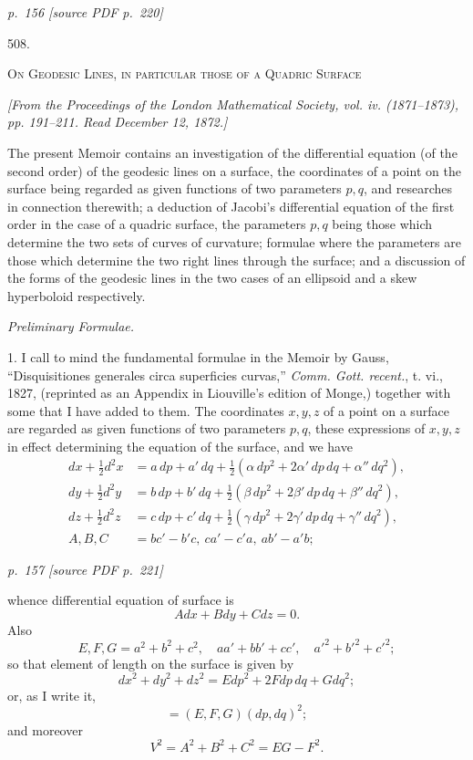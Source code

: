 \documentclass[11pt,a4paper]{article}
\newcommand{\sourcepage}[2]{%
  \bigskip
  \noindent\textit{p.~#1 [source PDF p.~#2]}%
  \par\smallskip
}
\newcommand{\paper}[2]{%
  \begin{center}
    {\Large #1.}\par\vspace{0.75em}
    {\large\scshape #2}
  \end{center}
}
\newcommand{\pubnote}[1]{%
  \begin{center}\small\itshape #1\end{center}
}
\newcommand{\qform}[2]{(#1)(#2)^2}
\begin{document}
\sourcepage{156}{220}
\paper{508}{On Geodesic Lines, in particular those of a Quadric Surface}
\pubnote{[From the Proceedings of the London Mathematical Society, vol. iv. (1871--1873), pp. 191--211. Read December 12, 1872.]}

The present Memoir contains an investigation of the differential equation (of the
second order) of the geodesic lines on a surface, the coordinates of a point on the
surface being regarded as given functions of two parameters \(p,q\), and researches
in connection therewith; a deduction of Jacobi's differential equation of the first
order in the case of a quadric surface, the parameters \(p,q\) being those which
determine the two sets of curves of curvature; formulae where the parameters are
those which determine the two right lines through the surface; and a discussion of
the forms of the geodesic lines in the two cases of an ellipsoid and a skew hyperboloid
respectively.

\begin{center}\itshape Preliminary Formulae.\end{center}

1. I call to mind the fundamental formulae in the Memoir by Gauss, ``Disquisitiones
generales circa superficies curvas,'' \emph{Comm. Gott. recent.}, t. vi., 1827, (reprinted
as an Appendix in Liouville's edition of Monge,) together with some that I have
added to them. The coordinates \(x,y,z\) of a point on a surface are regarded as given
functions of two parameters \(p,q\), these expressions of \(x,y,z\) in effect determining
the equation of the surface, and we have
\[
\begin{aligned}
dx+\tfrac12d^2x&=a\,dp+a'\,dq+\tfrac12(\alpha\,dp^2+2\alpha'\,dp\,dq+\alpha''\,dq^2),\\
dy+\tfrac12d^2y&=b\,dp+b'\,dq+\tfrac12(\beta\,dp^2+2\beta'\,dp\,dq+\beta''\,dq^2),\\
dz+\tfrac12d^2z&=c\,dp+c'\,dq+\tfrac12(\gamma\,dp^2+2\gamma'\,dp\,dq+\gamma''\,dq^2),\\
A,B,C&=bc'-b'c,\ ca'-c'a,\ ab'-a'b;
\end{aligned}
\]

\sourcepage{157}{221}

whence differential equation of surface is
\[
Adx+Bdy+Cdz=0.
\]
Also
\[
E,F,G=a^2+b^2+c^2,\quad aa'+bb'+cc',\quad a'^2+b'^2+c'^2;
\]
so that element of length on the surface is given by
\[
dx^2+dy^2+dz^2=Edp^2+2Fdp\,dq+Gdq^2;
\]
or, as I write it,
\[
=\qform{E,F,G}{dp,dq};
\]
and moreover
\[
V^2=A^2+B^2+C^2=EG-F^2.
\]
\end{document}
